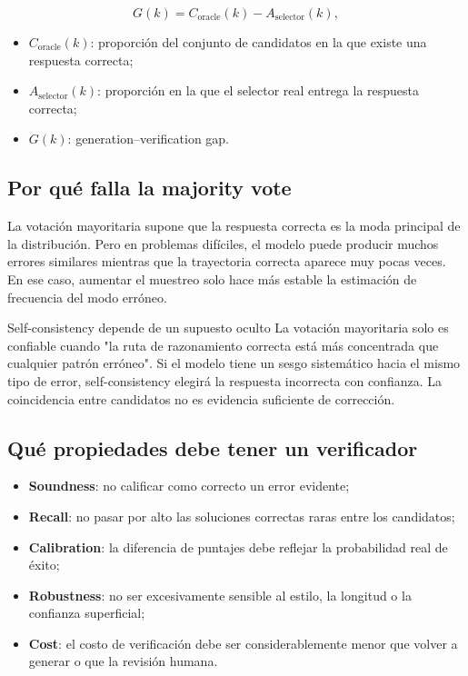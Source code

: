 \documentclass[a4paper]{article}
\begin{document}
$$
G(k)=C_{\mathrm{oracle}}(k)-A_{\mathrm{selector}}(k),
$$

\begin{itemize}
    \item $C_{\mathrm{oracle}}(k)$: proporción del conjunto de candidatos en la que existe una respuesta correcta;
    \item $A_{\mathrm{selector}}(k)$: proporción en la que el selector real entrega la respuesta correcta;
    \item $G(k)$: generation--verification gap.
\end{itemize}

\subsection{Por qué falla la majority vote}

La votación mayoritaria supone que la respuesta correcta es la moda principal de la distribución. Pero en problemas difíciles, el modelo puede producir muchos errores similares mientras que la trayectoria correcta aparece muy pocas veces. En ese caso, aumentar el muestreo solo hace más estable la estimación de frecuencia del modo erróneo.


\begin{warningbox}{Self-consistency depende de un supuesto oculto}
La votación mayoritaria solo es confiable cuando "la ruta de razonamiento correcta está más concentrada que cualquier patrón erróneo". Si el modelo tiene un sesgo sistemático hacia el mismo tipo de error, self-consistency elegirá la respuesta incorrecta con confianza. La coincidencia entre candidatos no es evidencia suficiente de corrección.
\end{warningbox}

\subsection{Qué propiedades debe tener un verificador}

\begin{itemize}
    \item \textbf{Soundness}: no calificar como correcto un error evidente;
    \item \textbf{Recall}: no pasar por alto las soluciones correctas raras entre los candidatos;
    \item \textbf{Calibration}: la diferencia de puntajes debe reflejar la probabilidad real de éxito;
    \item \textbf{Robustness}: no ser excesivamente sensible al estilo, la longitud o la confianza superficial;
    \item \textbf{Cost}: el costo de verificación debe ser considerablemente menor que volver a generar o que la revisión humana.
\end{itemize}
\end{document}
